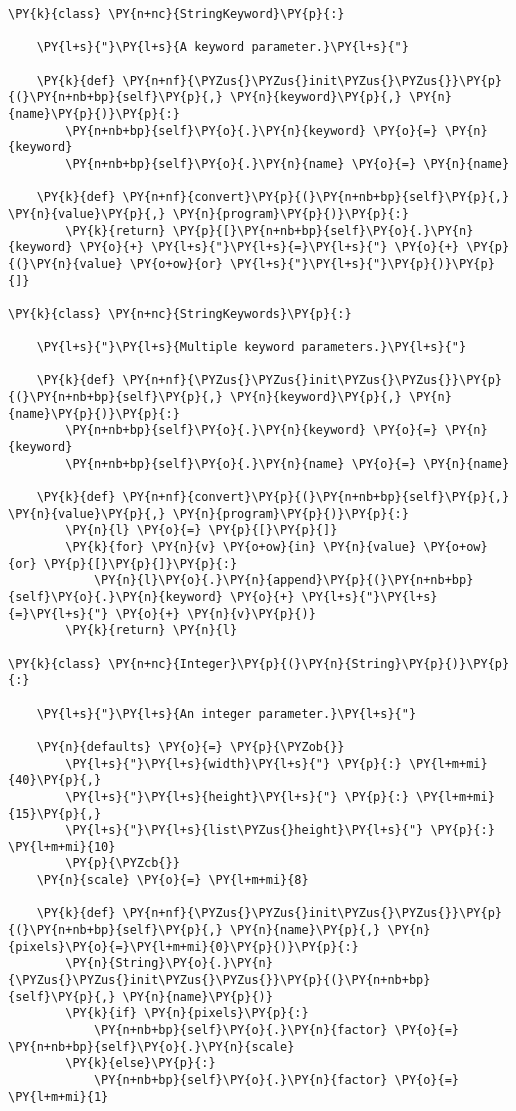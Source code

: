 \begin{Verbatim}[commandchars=\\\{\}]
\PY{k}{class} \PY{n+nc}{StringKeyword}\PY{p}{:}

    \PY{l+s}{"}\PY{l+s}{A keyword parameter.}\PY{l+s}{"}

    \PY{k}{def} \PY{n+nf}{\PYZus{}\PYZus{}init\PYZus{}\PYZus{}}\PY{p}{(}\PY{n+nb+bp}{self}\PY{p}{,} \PY{n}{keyword}\PY{p}{,} \PY{n}{name}\PY{p}{)}\PY{p}{:}
        \PY{n+nb+bp}{self}\PY{o}{.}\PY{n}{keyword} \PY{o}{=} \PY{n}{keyword}
        \PY{n+nb+bp}{self}\PY{o}{.}\PY{n}{name} \PY{o}{=} \PY{n}{name}

    \PY{k}{def} \PY{n+nf}{convert}\PY{p}{(}\PY{n+nb+bp}{self}\PY{p}{,} \PY{n}{value}\PY{p}{,} \PY{n}{program}\PY{p}{)}\PY{p}{:}
        \PY{k}{return} \PY{p}{[}\PY{n+nb+bp}{self}\PY{o}{.}\PY{n}{keyword} \PY{o}{+} \PY{l+s}{"}\PY{l+s}{=}\PY{l+s}{"} \PY{o}{+} \PY{p}{(}\PY{n}{value} \PY{o+ow}{or} \PY{l+s}{"}\PY{l+s}{"}\PY{p}{)}\PY{p}{]}

\PY{k}{class} \PY{n+nc}{StringKeywords}\PY{p}{:}

    \PY{l+s}{"}\PY{l+s}{Multiple keyword parameters.}\PY{l+s}{"}

    \PY{k}{def} \PY{n+nf}{\PYZus{}\PYZus{}init\PYZus{}\PYZus{}}\PY{p}{(}\PY{n+nb+bp}{self}\PY{p}{,} \PY{n}{keyword}\PY{p}{,} \PY{n}{name}\PY{p}{)}\PY{p}{:}
        \PY{n+nb+bp}{self}\PY{o}{.}\PY{n}{keyword} \PY{o}{=} \PY{n}{keyword}
        \PY{n+nb+bp}{self}\PY{o}{.}\PY{n}{name} \PY{o}{=} \PY{n}{name}

    \PY{k}{def} \PY{n+nf}{convert}\PY{p}{(}\PY{n+nb+bp}{self}\PY{p}{,} \PY{n}{value}\PY{p}{,} \PY{n}{program}\PY{p}{)}\PY{p}{:}
        \PY{n}{l} \PY{o}{=} \PY{p}{[}\PY{p}{]}
        \PY{k}{for} \PY{n}{v} \PY{o+ow}{in} \PY{n}{value} \PY{o+ow}{or} \PY{p}{[}\PY{p}{]}\PY{p}{:}
            \PY{n}{l}\PY{o}{.}\PY{n}{append}\PY{p}{(}\PY{n+nb+bp}{self}\PY{o}{.}\PY{n}{keyword} \PY{o}{+} \PY{l+s}{"}\PY{l+s}{=}\PY{l+s}{"} \PY{o}{+} \PY{n}{v}\PY{p}{)}
        \PY{k}{return} \PY{n}{l}

\PY{k}{class} \PY{n+nc}{Integer}\PY{p}{(}\PY{n}{String}\PY{p}{)}\PY{p}{:}

    \PY{l+s}{"}\PY{l+s}{An integer parameter.}\PY{l+s}{"}

    \PY{n}{defaults} \PY{o}{=} \PY{p}{\PYZob{}}
        \PY{l+s}{"}\PY{l+s}{width}\PY{l+s}{"} \PY{p}{:} \PY{l+m+mi}{40}\PY{p}{,}
        \PY{l+s}{"}\PY{l+s}{height}\PY{l+s}{"} \PY{p}{:} \PY{l+m+mi}{15}\PY{p}{,}
        \PY{l+s}{"}\PY{l+s}{list\PYZus{}height}\PY{l+s}{"} \PY{p}{:} \PY{l+m+mi}{10}
        \PY{p}{\PYZcb{}}
    \PY{n}{scale} \PY{o}{=} \PY{l+m+mi}{8}

    \PY{k}{def} \PY{n+nf}{\PYZus{}\PYZus{}init\PYZus{}\PYZus{}}\PY{p}{(}\PY{n+nb+bp}{self}\PY{p}{,} \PY{n}{name}\PY{p}{,} \PY{n}{pixels}\PY{o}{=}\PY{l+m+mi}{0}\PY{p}{)}\PY{p}{:}
        \PY{n}{String}\PY{o}{.}\PY{n}{\PYZus{}\PYZus{}init\PYZus{}\PYZus{}}\PY{p}{(}\PY{n+nb+bp}{self}\PY{p}{,} \PY{n}{name}\PY{p}{)}
        \PY{k}{if} \PY{n}{pixels}\PY{p}{:}
            \PY{n+nb+bp}{self}\PY{o}{.}\PY{n}{factor} \PY{o}{=} \PY{n+nb+bp}{self}\PY{o}{.}\PY{n}{scale}
        \PY{k}{else}\PY{p}{:}
            \PY{n+nb+bp}{self}\PY{o}{.}\PY{n}{factor} \PY{o}{=} \PY{l+m+mi}{1}


\end{Verbatim}
